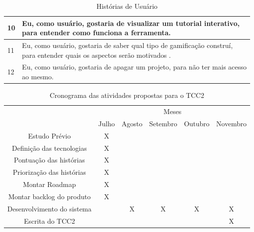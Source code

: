 \begin{table}[!htpb]
\begin{tabular}{|p{1.5cm}|p{12cm}|}
 10 & Eu, como usuário, gostaria de visualizar um tutorial interativo, para entender como funciona a ferramenta. \\ \hline

 11 & Eu, como usuário, gostaria de saber qual tipo de gamificação construí, para entender quais os aspectos serão motivados . \\ \hline

 12 & Eu, como usuário, gostaria de apagar um projeto, para não ter mais acesso ao mesmo. \\ \hline
 
\end{tabular}
\caption{Histórias de Usuário\label{tab01}
}
\end{table} 
\newpage

\begin{table}[!htpb]
\centering

\begin{small} 
  
\setlength{\tabcolsep}{3pt} 


\begin{tabular}{|c|c|c|c|c|c|}\hline
 & \multicolumn{5}{c|}{Meses}\\ \cline{2-6}
\raisebox{1.5ex}{Atividades} & Julho & Agosto & Setembro & Outubro & Novembro \\  \hline

Estudo Prévio & X & & & & \\ \hline
Definição das tecnologias & X & & & & \\ \hline
Pontuação das histórias & X & & & & \\ \hline
Priorização das histórias & X & & & & \\ \hline
Montar Roadmap & X & & & & \\ \hline
Montar backlog do produto & X & & & &\\ \hline
Desenvolvimento do sistema & & X & X & X & X \\ \hline
Escrita do TCC2 & & & & & X \\ \hline


\end{tabular} 
\end{small}
\caption{Cronograma das atividades propostas para o TCC2\label{t_cronograma2}
}
\end{table} 

